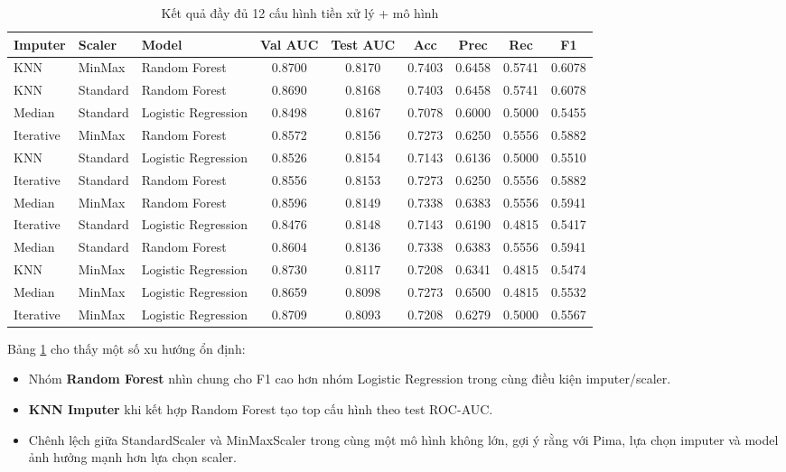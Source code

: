 \begin{table}[H]
\centering
\caption{Kết quả đầy đủ 12 cấu hình tiền xử lý + mô hình}
\label{tab:full_12_configs}
\scriptsize
\begin{tabular}{lllcccccc}
\toprule
\textbf{Imputer} & \textbf{Scaler} & \textbf{Model} & \textbf{Val AUC} & \textbf{Test AUC} & \textbf{Acc} & \textbf{Prec} & \textbf{Rec} & \textbf{F1}\\
\midrule
KNN & MinMax & Random Forest & 0.8700 & 0.8170 & 0.7403 & 0.6458 & 0.5741 & 0.6078\\
KNN & Standard & Random Forest & 0.8690 & 0.8168 & 0.7403 & 0.6458 & 0.5741 & 0.6078\\
Median & Standard & Logistic Regression & 0.8498 & 0.8167 & 0.7078 & 0.6000 & 0.5000 & 0.5455\\
Iterative & MinMax & Random Forest & 0.8572 & 0.8156 & 0.7273 & 0.6250 & 0.5556 & 0.5882\\
KNN & Standard & Logistic Regression & 0.8526 & 0.8154 & 0.7143 & 0.6136 & 0.5000 & 0.5510\\
Iterative & Standard & Random Forest & 0.8556 & 0.8153 & 0.7273 & 0.6250 & 0.5556 & 0.5882\\
Median & MinMax & Random Forest & 0.8596 & 0.8149 & 0.7338 & 0.6383 & 0.5556 & 0.5941\\
Iterative & Standard & Logistic Regression & 0.8476 & 0.8148 & 0.7143 & 0.6190 & 0.4815 & 0.5417\\
Median & Standard & Random Forest & 0.8604 & 0.8136 & 0.7338 & 0.6383 & 0.5556 & 0.5941\\
KNN & MinMax & Logistic Regression & 0.8730 & 0.8117 & 0.7208 & 0.6341 & 0.4815 & 0.5474\\
Median & MinMax & Logistic Regression & 0.8659 & 0.8098 & 0.7273 & 0.6500 & 0.4815 & 0.5532\\
Iterative & MinMax & Logistic Regression & 0.8709 & 0.8093 & 0.7208 & 0.6279 & 0.5000 & 0.5567\\
\bottomrule
\end{tabular}
\normalsize
\end{table}

\noindent
Bảng \ref{tab:full_12_configs} cho thấy một số xu hướng ổn định:
\begin{itemize}[leftmargin=1.5em]
    \item Nhóm \textbf{Random Forest} nhìn chung cho F1 cao hơn nhóm Logistic Regression trong cùng điều kiện imputer/scaler.
    \item \textbf{KNN Imputer} khi kết hợp Random Forest tạo top cấu hình theo test ROC-AUC.
    \item Chênh lệch giữa StandardScaler và MinMaxScaler trong cùng một mô hình không lớn, gợi ý rằng với Pima, lựa chọn imputer và model
    ảnh hưởng mạnh hơn lựa chọn scaler.
\end{itemize}


